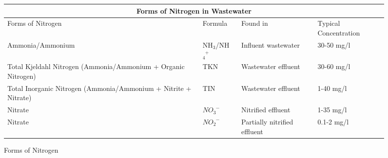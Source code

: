 					      \begin{center}
					      \begin{figure}[!htbp]
					      	\noindent \begin{tabular}[!htbp]{ |p{6cm}|p{2.0cm}|p{2.5cm}|p{}|}
					      	\hline
					      	\multicolumn{4}{|c|}{\textbf{Forms of Nitrogen in Wastewater}} \\
					      	\hline
					      	
					      	\hspace{1.8 cm}Forms of Nitrogen & \hspace{0.25 cm} Formula & \hspace{.4 cm} Found in & \hspace{.4 cm} Typical \newline \hspace{.2 cm}Concentration\\
					      	\hline
					      	\small Ammonia/Ammonium & \small NH$_3$/NH$_4^{\enspace +}$ &  \small Influent wastewater & 30-50 mg/l\\
					      	
					      	Total Kjeldahl Nitrogen \newline  \small (Ammonia/Ammonium + Organic Nitrogen) &  \small TKN &  \small Wastewater \newline  \small effluent  & 30-60 mg/l \\
					      	
					      	\small Total Inorganic Nitrogen \newline  \small (Ammonia/Ammonium + Nitrite + Nitrate) & \small TIN &  \small  Wastewater \newline  \small effluent  & 1-40 mg/l \\
					      	
					      	\small Nitrate  & $NO_3^{\enspace -}$ &  \small Nitrified effluent &  \small 1-35 mg/l \\
					      	
					      	\small Nitrate  &  $NO_2^{\enspace -}$ &  \small Partially nitrified effluent &  \small 0.1-2 mg/l \\
					      	
					      	\hline
					      	\end{tabular}
					      	\caption{Forms of Nitrogen}
					      	\end{figure}
					      \end{center}
					      
